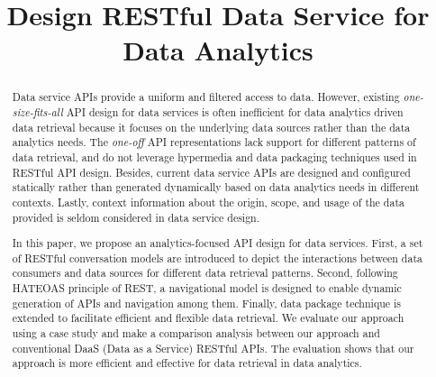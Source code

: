 \documentclass[10pt, conference, compsocconf]{IEEEtran}
\begin{document}
%
\title{Design RESTful Data Service for Data Analytics}


\author{
	}

\maketitle


\begin{abstract}
Data service APIs provide a uniform and filtered access to data. However, existing \textit{one-size-fits-all} API design for data services is often inefficient for data analytics driven data retrieval because it focuses on the underlying data sources rather than the data analytics needs. The \textit{one-off} API representations lack support for different patterns of data retrieval, and do not leverage hypermedia and data packaging techniques used in RESTful API design. Besides, current data service APIs are designed and configured statically rather than generated dynamically based on data analytics needs in different contexts. Lastly, context information about the origin, scope, and usage of the data provided is seldom considered in data service design.


In this paper, we propose an analytics-focused API design for data services. First, a set of RESTful conversation models are introduced to depict the interactions between data consumers and data sources for different data retrieval patterns. Second, following HATEOAS principle of REST, a navigational model is designed to enable dynamic generation of APIs and navigation among them.  Finally, data package technique is extended to facilitate efficient and flexible data retrieval. We evaluate our approach using a case study and make a comparison analysis between our approach and conventional DaaS (Data as a Service) RESTful APIs. The evaluation shows that our approach is more efficient and effective for data retrieval in data analytics.


\end{abstract}
\end{document}

